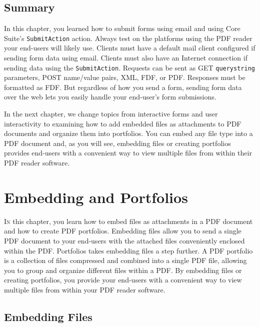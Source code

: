 \documentclass[american,letterpaper]{tufte-book}
\numberwithin{equation}{section}
\numberwithin{figure}{section}
\def\color#1{}%
\begin{document}
{{\begin{figure}
\end{figure}


\section{Summary}

In this chapter, you learned how to submit forms using email and using
Core Suite's \texttt{SubmitAction} action. Always test on the platforms
using the PDF reader your end-users will likely use. Clients must
have a default mail client configured if sending form data using email.
Clients must also have an Internet connection if sending data using
the \texttt{SubmitAction}. Requests can be sent as GET \texttt{querystring}
parameters, POST name/value pairs, XML, FDF, or PDF. Responses must
be formatted as FDF. But regardless of how you send a form, sending
form data over the web lets you easily handle your end-user's form
submissions.

In the next chapter, we change topics from interactive forms and user
interactivity to examining how to add embedded files as attachments
to PDF documents and organize them into portfolios. You can embed
any file type into a PDF document and, as you will see, embedding
files or creating portfolios provides end-users with a convenient
way to view multiple files from within their PDF reader software.

\color{white}
\chapter{Embedding and Portfolios}\label{chap:Embedding-Files-and}
\color{black}
\BgThispage
\vspace{8.0em}
\lettrine[lines=2,lhang=0.1]{I}{n} this chapter, you learn how to embed files as attachments in a
PDF document and how to create PDF portfolios. Embedding files allow
you to send a single PDF document to your end-users with the attached
files conveniently enclosed within the PDF. Portfolios takes embedding
files a step further. A PDF portfolio is a collection of files compressed
and combined into a single PDF file, allowing you to group and organize
different files within a PDF. By embedding files or creating portfolios,
you provide your end-users with a convenient way to view multiple
files from within your PDF reader software. 

\section{Embedding Files}

}}
\end{document}
